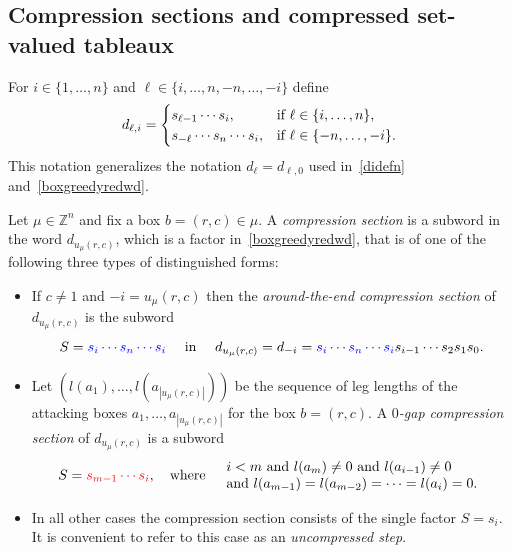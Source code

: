 \documentclass[11pt]{article}
\theoremstyle{plain}
\theoremstyle{definition}
\theoremstyle{remark}
\numberwithin{equation}{section}
\def\ZZ{\mathbb{Z}}
\newcounter{r}
\newcounter{s}
\begin{document}
\subsection{Compression sections and compressed set-valued tableaux}\label{set-valued tab}

For $i\in \{1, \ldots, n\}$ and $\ell\in \{i, \ldots, n, -n, \ldots, -i\}$ define
\begin{equation}
d_{\ell,i} = \begin{cases}
s_{\ell-1}\cdots s_i, &\hbox{if $\ell\in \{i, \ldots, n\}$,} \\
s_{-\ell} \cdots s_n\cdots s_i, &\hbox{if $\ell\in \{-n, \ldots, -i\}$.}
\end{cases}
\label{dilfactor}
\end{equation}
This notation generalizes the notation $d_\ell = d_{\ell,0}$ used in~\eqref{didefn} and~\eqref{boxgreedyredwd}.

Let $\mu \in \ZZ^{n}$ and fix a box $b = (r,c)\in \mu$.
A \emph{compression section} is a subword in the word $d_{u_{\mu}(r, c)}$, which is a factor in~\eqref{boxgreedyredwd}, that is of one of the following three types of distinguished forms: 

\medskip\noindent
\begin{itemize}
\item[(CS1)]  If $c\ne1$ and $-i = u_\mu(r,c)$ then 
the \emph{\color{blue} around-the-end compression section} of $d_{u_{\mu}(r, c)}$ is the subword 
$$S={\color{blue} s_i\cdots s_n\cdots s_i} \quad \hbox{ in } \quad d_{u_{\mu}(r, c)} = d_{-i} = {\color{blue} s_i\cdots s_n\cdots s_i} s_{i-1}\cdots s_2 s_1s_0.$$

\item[(CS2)] 
Let  $(l(a_1), \ldots, l(a_{|u_\mu(r,c)|}))$ be the sequence of leg lengths of the attacking boxes
$a_1, \ldots, a_{|u_\mu(r,c)|}$ for the box $b=(r,c)$.
A \emph{\color{red}$0$-gap compression section} of $d_{u_\mu(r,c)}$ is a subword 
$$S={\color{red}s_{m-1} \cdots s_{i}}, \quad\hbox{where}\quad
\begin{array}{l}
\hbox{$i<m$ and $l(a_m)\ne 0$ and $l(a_{i-1})\ne 0$} \\
\hbox{and $l(a_{m-1}) = l(a_{m-2}) = \cdots = l(a_{i}) = 0$.}
\end{array}
$$


\medskip\noindent
\item[(CS3)] In all other cases the compression section consists
of the single factor $S=s_i$. It is convenient to refer to this case as an \emph{uncompressed step}.  
\end{itemize}
\end{document}
